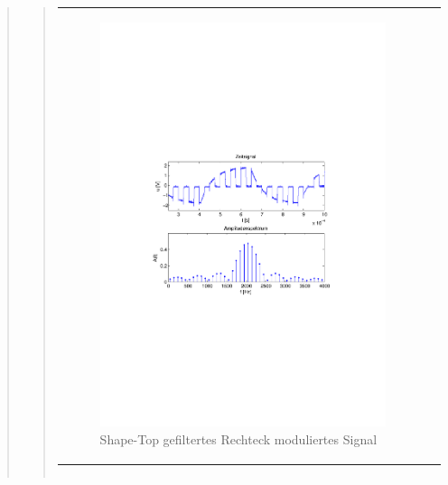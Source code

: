 \begin{quote}
\begin{quote}
\begin{center}
\begin{tabular}{ll}
                \begin{minipage}{0.6\textwidth}
                    \begin{figure}[H]
                       \includegraphics[scale=0.55, trim = 16mm 70mm 16mm 85mm, clip]{Bilder/shaperecFil20_05abget_zeit}
                       \caption{Shape-Top gefiltertes Rechteck moduliertes Signal}
		              \label{fig:shaperecFil20_05zeit}
                    \end{figure}
                \end{minipage}
            
            \end{tabular}
            \end{center}
            
            \begin{center}
            \begin{tabular}{ll}
            

\end{tabular}
\end{center}
\end{quote}
\end{quote}

